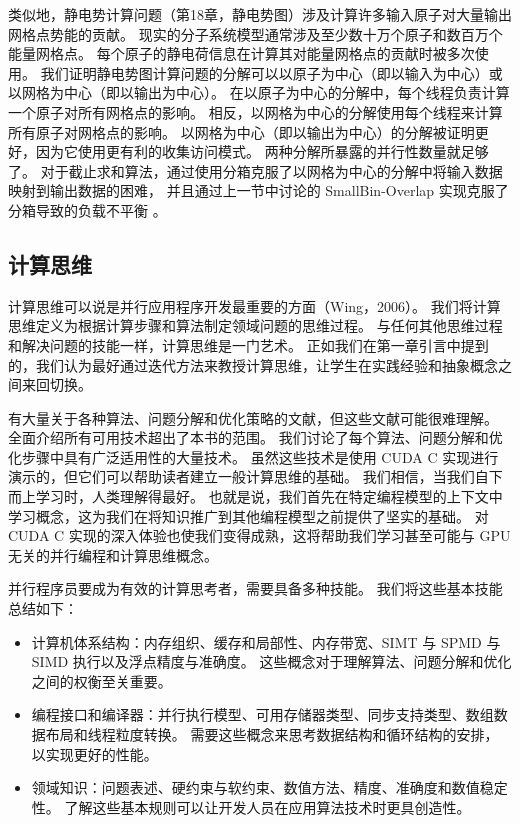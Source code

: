 类似地，静电势计算问题（第18章，静电势图）涉及计算许多输入原子对大量输出网格点势能的贡献。 
现实的分子系统模型通常涉及至少数十万个原子和数百万个能量网格点。 
每个原子的静电荷信息在计算其对能量网格点的贡献时被多次使用。 
我们证明静电势图计算问题的分解可以以原子为中心（即以输入为中心）或以网格为中心（即以输出为中心）。 
在以原子为中心的分解中，每个线程负责计算一个原子对所有网格点的影响。 
相反，以网格为中心的分解使用每个线程来计算所有原子对网格点的影响。 
以网格为中心（即以输出为中心）的分解被证明更好，因为它使用更有利的收集访问模式。 两种分解所暴露的并行性数量就足够了。 
对于截止求和算法，通过使用分箱克服了以网格为中心的分解中将输入数据映射到输出数据的困难，
并且通过上一节中讨论的 SmallBin-Overlap 实现克服了分箱导致的负载不平衡 。

\subsection{计算思维}
计算思维可以说是并行应用程序开发最重要的方面（Wing，2006）。 
我们将计算思维定义为根据计算步骤和算法制定领域问题的思维过程。 
与任何其他思维过程和解决问题的技能一样，计算思维是一门艺术。 
正如我们在第一章引言中提到的，我们认为最好通过迭代方法来教授计算思维，让学生在实践经验和抽象概念之间来回切换。

有大量关于各种算法、问题分解和优化策略的文献，但这些文献可能很难理解。 全面介绍所有可用技术超出了本书的范围。 
我们讨论了每个算法、问题分解和优化步骤中具有广泛适用性的大量技术。 
虽然这些技术是使用 CUDA C 实现进行演示的，但它们可以帮助读者建立一般计算思维的基础。 
我们相信，当我们自下而上学习时，人类理解得最好。 
也就是说，我们首先在特定编程模型的上下文中学习概念，这为我们在将知识推广到其他编程模型之前提供了坚实的基础。 
对 CUDA C 实现的深入体验也使我们变得成熟，这将帮助我们学习甚至可能与 GPU 无关的并行编程和计算思维概念。

并行程序员要成为有效的计算思考者，需要具备多种技能。 我们将这些基本技能总结如下：
\begin{itemize}
	\item 计算机体系结构：内存组织、缓存和局部性、内存带宽、SIMT 与 SPMD 与 SIMD 执行以及浮点精度与准确度。 
		这些概念对于理解算法、问题分解和优化之间的权衡至关重要。

	\item 编程接口和编译器：并行执行模型、可用存储器类型、同步支持类型、数组数据布局和线程粒度转换。 
		需要这些概念来思考数据结构和循环结构的安排，以实现更好的性能。

	\item 领域知识：问题表述、硬约束与软约束、数值方法、精度、准确度和数值稳定性。 
		了解这些基本规则可以让开发人员在应用算法技术时更具创造性。
\end{itemize}

